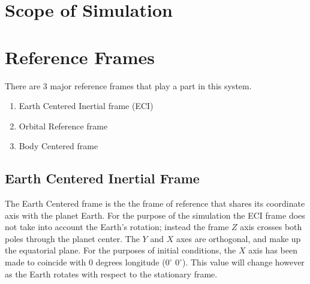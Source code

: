 \documentclass[12pt,a4paper]{article}
\begin{document}
\section{Scope of Simulation}



\section{Reference Frames}
There are 3 major reference frames that play a part in this system. 
\begin{enumerate}
\item Earth Centered Inertial frame (ECI)
\item Orbital Reference frame 
\item Body Centered frame
\end{enumerate}

\subsection{Earth Centered Inertial Frame}
The Earth Centered frame is the the frame of reference that shares its coordinate axis with the planet Earth. For the purpose of the simulation the ECI frame does not take into account the Earth's rotation; instead the frame $Z$ axis crosses both poles through the planet center. The $Y$ and $X$ axes are orthogonal, and make up the equatorial plane. For the purposes of initial conditions, the $X$ axis has been made to coincide with 0 degrees longitude ($0^{\circ}$ $0^{\circ}$). This value will change however as the Earth rotates with respect to the stationary frame. 
\end{document}
